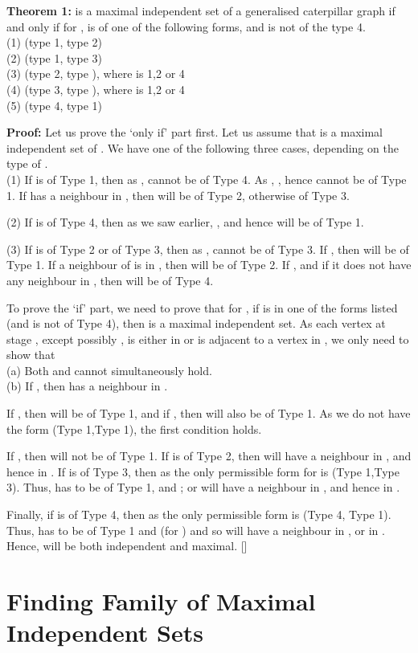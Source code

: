 \documentclass[10pt]{article}
\begin{document}
{\textbf{Theorem 1:}}  is a maximal
independent set of a generalised caterpillar graph  if and
only if for ,  is of one of the
following forms, and  is not of the type 4.\\ (1) (type 1, type 2)\\
(2) (type 1, type 3)\\ (3) (type 2, type ), where  is 1,2 or 4\\
(4) (type 3, type ), where  is 1,2 or 4\\ (5) (type 4, type 1)

{\textbf{Proof:}} Let us prove the `only if' part first. Let us assume
that  is a maximal independent set of . We have one of
the following three cases, depending on the type of .\\
(1)  If  is of Type 1, then as ,  cannot be
of Type 4. As , , hence 
cannot be of Type 1. If  has a neighbour in , then
 will be of Type 2, otherwise of Type 3.

\noindent (2) If  is of Type 4, then as we saw earlier, ,
and hence  will be of Type 1.

\noindent (3) If  is of Type 2 or of Type 3, then as ,
 cannot be of Type 3. If , then 
will be of Type 1. If a neighbour of  is in , then
 will be of Type 2. If , and if it does
not have any neighbour in , then  will be of Type 4.

To prove the `if' part, we need to prove that for , if
 is in one of the forms listed (and  is not of Type
4), then  is a maximal independent set. As each vertex at stage ,
except possibly , is either in  or is adjacent to a vertex in
, we only need to show that \\ (a) Both  and  cannot simultaneously hold.\\ (b) If , then
 has a neighbour in .

If , then  will be of Type 1, and if , then  will also be of Type 1. As we do not have the
form (Type 1,Type 1), the first condition holds.

If , then  will not be of Type 1. If  is of
Type 2, then  will have a neighbour in , and hence in . If
 is of Type 3, then as the only permissible form for 
is (Type 1,Type 3). Thus,  has to be of Type 1, and ; or  will have a neighbour  in , and
hence in .

Finally, if  is of Type 4, then as the only permissible form is
(Type 4, Type 1). Thus,  has to be of Type 1 and  (for ) and so  will have a neighbour in
, or in . Hence,  will be both independent and maximal. []

\section{Finding  Family of Maximal Independent Sets}
\end{document}
